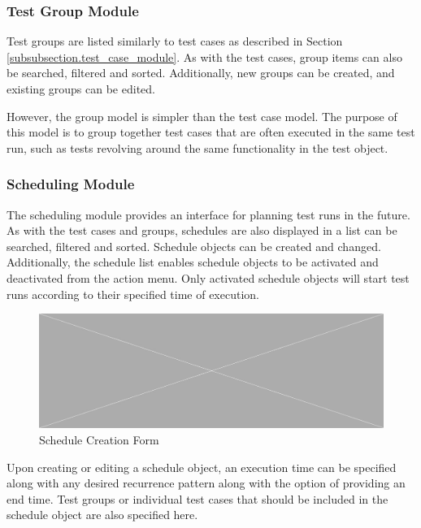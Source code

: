 \subsubsection{Test Group Module}

Test groups are listed similarly to test cases as described in Section \ref{subsubsection.test_case_module}. As with the test cases, group items can also be searched, filtered and sorted. Additionally, new groups can be created, and existing groups can be edited.

However, the group model is simpler than the test case model. The purpose of this model is to group together test cases that are often executed in the same test run, such as tests revolving around the same functionality in the test object.

\subsubsection{Scheduling Module}

The scheduling module provides an interface for planning test runs in the future. As with the test cases and groups, schedules are also displayed in a list can be searched, filtered and sorted. Schedule objects can be created and changed. Additionally, the schedule list enables schedule objects to be activated and deactivated from the action menu. Only activated schedule objects will start test runs according to their specified time of execution.

\begin{figure}[h]
    \centering
    \includegraphics[width=\textwidth]{figures/placeholder.png}
    \caption{Schedule Creation Form}
    \label{fig.sched_mod}
\end{figure}

Upon creating or editing a schedule object, an execution time can be specified along with any desired recurrence pattern along with the option of providing an end time. Test groups or individual test cases that should be included in the schedule object are also specified here.

